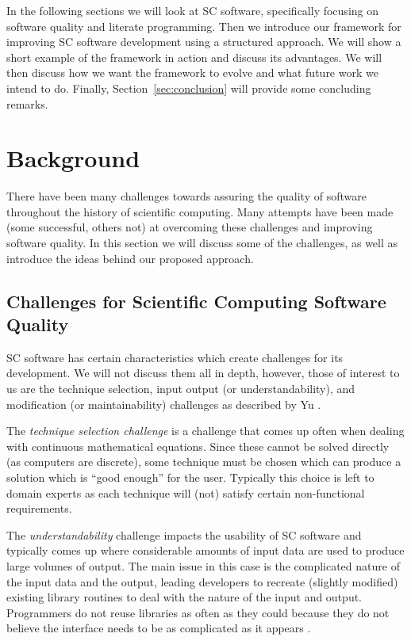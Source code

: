 \documentclass{sig-alternate-05-2015}
\begin{document}
In the following sections we will 
look at SC software, specifically focusing on software quality and literate
programming.
Then we introduce our framework %
for improving SC software development using a structured approach. We will show
a short example of the framework in action and discuss its advantages. 
We will then discuss how we want the framework to evolve and what future work we
intend to do. Finally, Section~\ref{sec:conclusion} will provide some concluding
remarks.

\section{Background} \label{sec:background}

There have been many challenges towards assuring the quality of software
throughout the history of scientific computing. Many attempts have been made
(some successful, others not) at overcoming these challenges and improving
software quality. In this section we will discuss some of the challenges, as
well as introduce the ideas behind our proposed approach.

\subsection{Challenges for Scientific Computing Software
  Quality} \label{ssec:challenges}

SC software has certain characteristics which create challenges for its
development. We will not discuss them all in depth, however, those of interest
to us are the technique selection, input output (or understandability), and
modification (or maintainability) challenges as described by Yu \cite{Yu2011}.

The \textit{technique selection challenge} is a challenge that comes up often
when dealing with continuous mathematical equations. Since these cannot be
solved directly (as computers are discrete), some technique must be chosen which
can produce a solution which is ``good enough'' for the user. Typically this
choice is left to domain experts as each technique will (not) satisfy certain
non-functional requirements. %

The \textit{understandability} challenge impacts the usability of SC software
and typically comes up where considerable amounts of input data are used to
produce large volumes of output. The main issue in this case is the complicated
nature of the input data and the output, leading developers to recreate
(slightly modified) existing library routines to deal with the nature of the
input and output. Programmers do not reuse libraries as often as they could
because they do not believe the interface needs to be as complicated as it
appears \cite{Dubois2002}.
\end{document}
